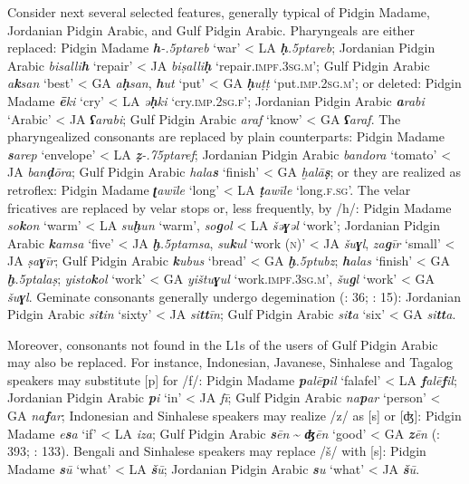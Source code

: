\documentclass[output=paper]{langsci/langscibook}
\begin{document}
Consider next several selected features, generally typical of Pidgin Madame, Jordanian Pidgin Arabic, and Gulf Pidgin Arabic.  Pharyngeals are either replaced: Pidgin Madame \textit{\textbf{h}\kern -.5ptareb} ‘war’ < LA \textit{\textbf{ḥ}\kern .5ptareb}; Jordanian Pidgin Arabic \textit{bisalli\textbf{h}} ‘repair’ < JA \textit{biṣalli\textbf{ḥ}} ‘repair.\textsc{impf}.\textsc{3sg.m}’; Gulf Pidgin Arabic \textit{a\textbf{k}san} ‘best’ < GA \textit{a\textbf{ḥ}san}, \textit{\textbf{h}ut} ‘put’ < GA \textit{\textbf{ḥ}uṭṭ} ‘put.\textsc{imp.2sg.m}’; or deleted: Pidgin Madame \textit{\textbf{ē}ki} ‘cry’ < LA \textit{ə\textbf{ḥ}ki} ‘cry.\textsc{imp}.2\textsc{sg}.\textsc{f}’; Jordanian Pidgin Arabic \textit{\textbf{a}rabi} ‘Arabic’ < JA \textit{\textbf{ʕ}arabi}; Gulf Pidgin Arabic \textit{araf} ‘know’ < GA \textit{\textbf{ʕ}araf}. The pharyngealized consonants are replaced by plain counterparts:  Pidgin Madame \textit{\textbf{s}arep} ‘envelope’ < LA \textit{\textbf{ẓ}\kern -.75ptaref}; Jordanian Pidgin Arabic \textit{bandora} ‘tomato’ < JA \textit{ban\textbf{ḍ}ōra}; Gulf Pidgin Arabic \textit{hala\textbf{s}} `finish' < GA \textit{ḫalā\textbf{ṣ}}; or they are realized as retroflex: Pidgin Madame \textit{\textbf{ʈ}awīle} ‘long’ < LA \textit{\textbf{ṭ}awīle} ‘long.\textsc{f}.\textsc{sg}’. The velar fricatives are replaced by velar stops or, less frequently, by /h/: Pidgin Madame \textit{so\textbf{k}on} ‘warm’ < LA \textit{su\textbf{ḫ}un} ‘warm’, \textit{so\textbf{g}ol} < LA \textit{šə\textbf{ɣ}əl} ‘work’; Jordanian Pidgin Arabic \textit{\textbf{k}amsa} ‘five’ < JA \textit{\textbf{ḫ}\kern .5ptamsa}, \textit{su\textbf{k}ul} ‘work (\textsc{n})’ < JA \textit{šu\textbf{ɣ}l}, \textit{za\textbf{g}īr} ‘small’ < JA \textit{ṣa\textbf{ɣ}īr}; Gulf Pidgin Arabic \textit{\textbf{k}ubus} ‘bread’ < GA \textit{\textbf{ḫ}\kern .5ptubz}; \textit{\textbf{h}alas} ‘finish’ < GA \textit{\textbf{ḫ}\kern .5ptalaṣ}; \textit{yisto\textbf{k}ol} ‘work’ < GA \textit{yištu\textbf{ɣ}ul} ‘work.\textsc{impf.3sg.m}’, \textit{šu\textbf{g}l} ‘work’ < GA \textit{šu\textbf{ɣ}l}. Geminate consonants generally undergo degemination (\citealt{Næss2008}: 36; \citealt{Avram2014Pidgin}: 15): Jordanian Pidgin Arabic \textit{si\textbf{t}in} ‘sixty’ < JA \textit{si\textbf{tt}īn}; Gulf Pidgin Arabic \textit{si\textbf{t}a} ‘six’ < GA \textit{si\textbf{tt}a}.

  Moreover, consonants not found in the L1s of the users of Gulf Pidgin Arabic may also be replaced. For instance, Indonesian, Javanese, Sinhalese and Tagalog speakers may substitute [p] for /f/: Pidgin Madame \textit{\textbf{p}alē\textbf{p}il} ‘falafel’ < LA \textit{\textbf{f}alē\textbf{f}il}; Jordanian Pidgin Arabic \textit{\textbf{p}i} ‘in’ < JA \textit{fī}; Gulf Pidgin Arabic \textit{na\textbf{p}ar} ‘person’ < GA \textit{na\textbf{f}ar}; Indonesian and Sinhalese speakers may realize /z/ as [s] or [ʤ]: Pidgin Madame \textit{e\textbf{s}a} ‘if’ < LA \textit{iza}; Gulf Pidgin Arabic \textit{\textbf{s}ēn} {\textasciitilde} \textit{\textbf{ʤ}ēn} ‘good’ < GA \textit{\textbf{z}ēn} (\citealt{Bizri2014}: 393; \citealt{Avram2017article}: 133). Bengali and Sinhalese speakers may replace /š/ with [s]: Pidgin Madame \textit{\textbf{s}ū} ‘what’ < LA \textit{\textbf{š}ū}; Jordanian Pidgin Arabic \textit{\textbf{s}u} ‘what’ < JA \textit{\textbf{š}ū}.
\end{document}
